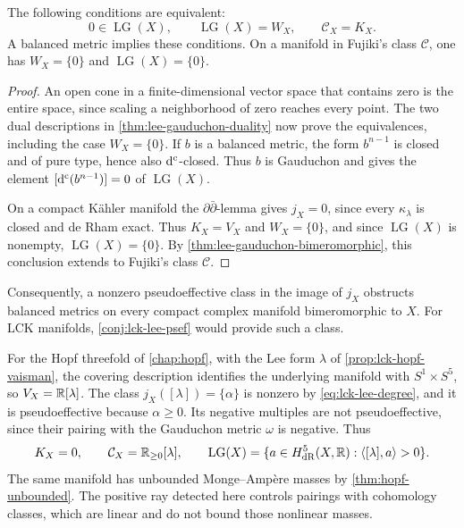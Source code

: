 \begin{corollary}\label{cor:lee-gauduchon-zero}
The following conditions are equivalent:
\[
 0\in\operatorname{LG}(X),\qquad
 \operatorname{LG}(X)=W_X,\qquad
 \mathcal C_X=K_X.
\]
A balanced metric implies these conditions. On a manifold in Fujiki's class $\mathcal C$, one has $W_X=\{0\}$ and $\operatorname{LG}(X)=\{0\}$.
\end{corollary}
\begin{proof}
An open cone in a finite-dimensional vector space that contains zero is the entire space, since scaling a neighborhood of zero reaches every point. The two dual descriptions in \cref{thm:lee-gauduchon-duality} now prove the equivalences, including the case $W_X=\{0\}$. If $b$ is a balanced metric, the form $b^{n-1}$ is closed and of pure type, hence also $\mathrm d^{\mathrm c}$-closed. Thus $b$ is Gauduchon and gives the element $[\mathrm d^{\mathrm c}(b^{n-1})]=0$ of $\operatorname{LG}(X)$.

On a compact K\"ahler manifold the $\partial\bar\partial$-lemma gives $j_X=0$, since every $\kappa_\lambda$ is closed and de Rham exact. Thus $K_X=V_X$ and $W_X=\{0\}$, and since $\operatorname{LG}(X)$ is nonempty, $\operatorname{LG}(X)=\{0\}$. By \cref{thm:lee-gauduchon-bimeromorphic}, this conclusion extends to Fujiki's class $\mathcal C$.
\end{proof}

Consequently, a nonzero pseudoeffective class in the image of $j_X$ obstructs balanced metrics on every compact complex manifold bimeromorphic to $X$. For LCK manifolds, \cref{conj:lck-lee-psef} would provide such a class.

For the Hopf threefold of \cref{chap:hopf}, with the Lee form $\lambda$ of \cref{prop:lck-hopf-vaisman}, the covering description identifies the underlying manifold with $S^1\times S^5$, so $V_X=\mathbb R[\lambda]$. The class $j_X([\lambda])=\{\alpha\}$ is nonzero by \eqref{eq:lck-lee-degree}, and it is pseudoeffective because $\alpha\geq0$. Its negative multiples are not pseudoeffective, since their pairing with the Gauduchon metric $\omega$ is negative. Thus
\[
 K_X=0,\qquad \mathcal C_X=\mathbb R_{\geq0}[\lambda],\qquad
 \operatorname{LG}(X)=\{a\in H^5_{\mathrm{dR}}(X,\mathbb R):
                                  \langle[\lambda],a\rangle>0\}.
\]
The same manifold has unbounded Monge--Amp\`ere masses by \cref{thm:hopf-unbounded}. The positive ray detected here controls pairings with cohomology classes, which are linear and do not bound those nonlinear masses.
